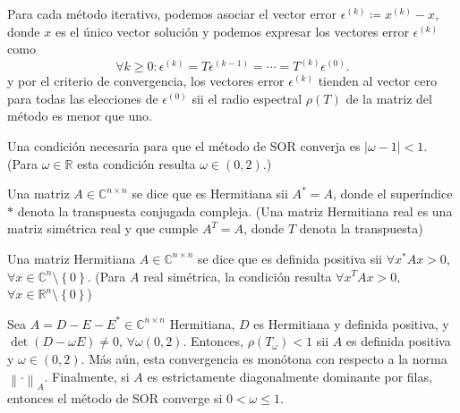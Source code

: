 \begin{frame}

	Para cada método iterativo, podemos asociar el vector error
	\begin{math}
		\epsilon^{\left(k\right)}\coloneqq
		x^{\left(k\right)}-x
	\end{math},
	donde $x$ es el único vector solución y podemos expresar los
	vectores error $\epsilon^{\left(k\right)}$ como
	\begin{equation*}
		\forall k\geq0:
		\epsilon^{\left(k\right)}=
		T\epsilon^{\left(k-1\right)}=
		\cdots=
		T^{\left(k\right)}\epsilon^{\left(0\right)}.
	\end{equation*}
	y por el \alert{criterio de convergencia}, los vectores error
	$\epsilon^{\left(k\right)}$ tienden al vector cero para todas las
	elecciones de $\epsilon^{\left(0\right)}$ sii el radio espectral
	$\rho\left(T\right)$ de la matriz del método es menor que uno.

	\begin{theorem}[Kahan]
		Una condición necesaria para que el \alert{método de SOR} converja
		es $\left|\omega-1\right|<1$.
		(Para $\omega\in\mathbb{R}$ esta condición resulta
		$\omega\in\left(0,2\right)$.)
	\end{theorem}

	\begin{definition}
		Una matriz $A\in\mathbb{C}^{n\times n}$ se dice que es Hermitiana
		sii $A^{\ast}=A$, donde el superíndice $\ast$ denota la
		transpuesta conjugada compleja.
		(Una matriz Hermitiana real es una matriz simétrica real y que
		cumple $A^{T}=A$, donde $T$ denota la transpuesta)
	\end{definition}

	\begin{definition}
		Una matriz Hermitiana $A\in\mathbb{C}^{n\times n}$ se dice que
		es definida positiva sii $\forall x^{\ast}Ax>0$,
		$\forall x\in\mathbb{C}^{n}\setminus\left\{0\right\}$.
		(Para $A$ real simétrica, la condición resulta
		$\forall x^{T}Ax>0$,
		$\forall x\in\mathbb{R}^{n}\setminus\left\{0\right\}$)
	\end{definition}

	\begin{theorem}
		Sea $A=D-E-E^{\ast}\in\mathbb{C}^{n\times n}$ Hermitiana,
		$D$ es Hermitiana y definida positiva, y
		$\det\left(D-\omega E\right)\neq0$,
		$\forall\omega\left(0,2\right)$.
		Entonces, $\rho\left(T_{\omega}\right)<1$ sii $A$ es definida
		positiva y $\omega\in\left(0,2\right)$.
		Más aún, esta convergencia es monótona con respecto a la norma
		${\left\|\cdot\right\|}_{A}$.
		Finalmente, si $A$ es estrictamente diagonalmente dominante por
		filas, entonces el \alert{método de SOR} converge si
		$0<\omega\leq1$.
	\end{theorem}
\end{frame}

